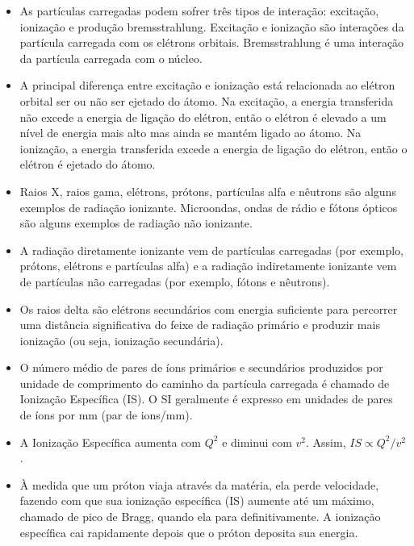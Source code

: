 \documentclass[11pt,a4paper]{article}
\newcounter{exemplo}
\begin{document}
\begin{exemplo}
\begin{itemize}
        \item As partículas carregadas podem sofrer três tipos de interação: excitação, ionização e produção bremsstrahlung. Excitação e ionização são interações da partícula carregada com os elétrons orbitais. Bremsstrahlung é uma interação da partícula carregada com o núcleo.
        
        \item A principal diferença entre excitação e ionização está relacionada ao elétron orbital ser ou não ser ejetado do átomo. Na excitação, a energia transferida não excede a energia de ligação do elétron, então o elétron é elevado a um nível de energia mais alto mas ainda se mantém ligado ao átomo. Na ionização, a energia transferida excede a energia de ligação do elétron, então o elétron é ejetado do átomo.
        
        \item Raios X, raios gama, elétrons, prótons, partículas alfa e nêutrons são alguns exemplos de radiação ionizante. Microondas, ondas de rádio e fótons ópticos são alguns exemplos de radiação não ionizante.
        
        \item A radiação diretamente ionizante vem de partículas carregadas (por exemplo, prótons, elétrons e partículas alfa) e a radiação indiretamente ionizante vem de partículas não carregadas (por exemplo, fótons e nêutrons).
        
        \item Os raios delta são elétrons secundários com energia suficiente para percorrer uma distância significativa do feixe de radiação primário e produzir mais ionização (ou seja, ionização secundária).
        
        \item O número médio de pares de íons primários e secundários produzidos por unidade de comprimento do caminho da partícula carregada é chamado de Ionização Específica (IS). O SI geralmente é expresso em unidades de pares de íons por mm (par de ions/mm).
        
        \item A  Ionização Específica aumenta com $Q^2$ e diminui com $v^2$. Assim, $IS \propto Q^2/v^2$.
        
        \item À medida que um próton viaja através da matéria, ela perde velocidade, fazendo com que sua ionização específica (IS) aumente até um máximo, chamado de pico de Bragg, quando ela para definitivamente. A ionização específica cai rapidamente depois que o próton deposita sua energia.
        

\end{itemize}
\end{exemplo}
\end{document}
